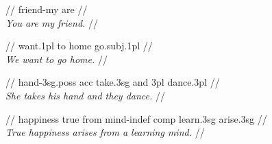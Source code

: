 \documentclass{article}
\begin{document}
\ex
\begingl
\gla {}   //
 friend-my are //
\\\textit{You are my friend.} //
\endgl
\xe

\ex
\begingl
\gla {}     //
 want.{\sc 1pl} to home go.{\sc subj.1pl} //
\\\textit{We want to go home.} //
\endgl
\xe

\ex
\begingl
\gla {}       //
 hand-{\sc 3sg.poss} {\sc acc} take.{\sc 3sg} and {\sc 3pl} dance.{\sc 3pl} //
\\\textit{She takes his hand and they dance.} //
\endgl
\xe

\ex
\begingl
\gla {}       //
\glb happiness true from mind-{\sc indef} {\sc comp} learn.{\sc 3sg} arise.{\sc 3sg} //
\\\textit{True happiness arises from a learning mind.} //
\endgl
\xe
\end{document}
